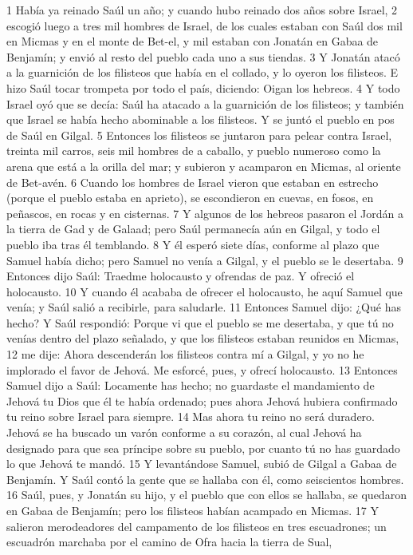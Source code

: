 1 Había ya reinado Saúl un año; y cuando hubo reinado dos años sobre Israel,
2 escogió luego a tres mil hombres de Israel, de los cuales estaban con Saúl dos mil en Micmas y en el monte de Bet-el, y mil estaban con Jonatán en Gabaa de Benjamín; y envió al resto del pueblo cada uno a sus tiendas.
3 Y Jonatán atacó a la guarnición de los filisteos que había en el collado, y lo oyeron los filisteos. E hizo Saúl tocar trompeta por todo el país, diciendo: Oigan los hebreos.
4 Y todo Israel oyó que se decía: Saúl ha atacado a la guarnición de los filisteos; y también que Israel se había hecho abominable a los filisteos. Y se juntó el pueblo en pos de Saúl en Gilgal.
5 Entonces los filisteos se juntaron para pelear contra Israel, treinta mil carros, seis mil hombres de a caballo, y pueblo numeroso como la arena que está a la orilla del mar; y subieron y acamparon en Micmas, al oriente de Bet-avén.
6 Cuando los hombres de Israel vieron que estaban en estrecho (porque el pueblo estaba en aprieto), se escondieron en cuevas, en fosos, en peñascos, en rocas y en cisternas.
7 Y algunos de los hebreos pasaron el Jordán a la tierra de Gad y de Galaad; pero Saúl permanecía aún en Gilgal, y todo el pueblo iba tras él temblando.
8 Y él esperó siete días, conforme al plazo que Samuel había dicho; pero Samuel no venía a Gilgal, y el pueblo se le desertaba.
9 Entonces dijo Saúl: Traedme holocausto y ofrendas de paz. Y ofreció el holocausto.
10 Y cuando él acababa de ofrecer el holocausto, he aquí Samuel que venía; y Saúl salió a recibirle, para saludarle.
11 Entonces Samuel dijo: ¿Qué has hecho? Y Saúl respondió: Porque vi que el pueblo se me desertaba, y que tú no venías dentro del plazo señalado, y que los filisteos estaban reunidos en Micmas,
12 me dije: Ahora descenderán los filisteos contra mí a Gilgal, y yo no he implorado el favor de Jehová. Me esforcé, pues, y ofrecí holocausto.
13 Entonces Samuel dijo a Saúl: Locamente has hecho; no guardaste el mandamiento de Jehová tu Dios que él te había ordenado; pues ahora Jehová hubiera confirmado tu reino sobre Israel para siempre.
14 Mas ahora tu reino no será duradero. Jehová se ha buscado un varón conforme a su corazón, al cual Jehová ha designado para que sea príncipe sobre su pueblo, por cuanto tú no has guardado lo que Jehová te mandó.
15 Y levantándose Samuel, subió de Gilgal a Gabaa de Benjamín. Y Saúl contó la gente que se hallaba con él, como seiscientos hombres.
16 Saúl, pues, y Jonatán su hijo, y el pueblo que con ellos se hallaba, se quedaron en Gabaa de Benjamín; pero los filisteos habían acampado en Micmas.
17 Y salieron merodeadores del campamento de los filisteos en tres escuadrones; un escuadrón marchaba por el camino de Ofra hacia la tierra de Sual,
